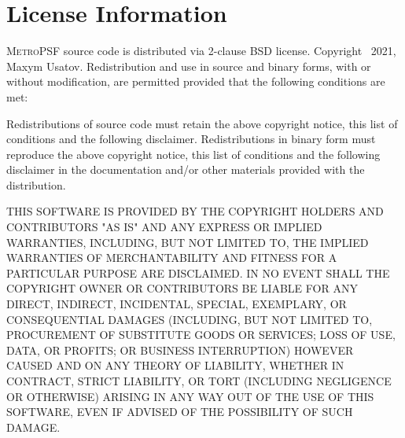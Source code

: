 \documentclass{article}
\begin{document}
\section{License Information}
\textsc{MetroPSF} source code is distributed via 2-clause BSD license. Copyright \textcopyright \ 2021, Maxym Usatov. Redistribution and use in source and binary forms, with or without modification, are permitted provided that the following conditions are met:

    Redistributions of source code must retain the above copyright notice, this list of conditions and the following disclaimer.
    Redistributions in binary form must reproduce the above copyright notice, this list of conditions and the following disclaimer in the documentation and/or other materials provided with the distribution.

THIS SOFTWARE IS PROVIDED BY THE COPYRIGHT HOLDERS AND CONTRIBUTORS "AS IS" AND ANY EXPRESS OR IMPLIED WARRANTIES, INCLUDING, BUT NOT LIMITED TO, THE IMPLIED WARRANTIES OF MERCHANTABILITY AND FITNESS FOR A PARTICULAR PURPOSE ARE DISCLAIMED. IN NO EVENT SHALL THE COPYRIGHT OWNER OR CONTRIBUTORS BE LIABLE FOR ANY DIRECT, INDIRECT, INCIDENTAL, SPECIAL, EXEMPLARY, OR CONSEQUENTIAL DAMAGES (INCLUDING, BUT NOT LIMITED TO, PROCUREMENT OF SUBSTITUTE GOODS OR SERVICES; LOSS OF USE, DATA, OR PROFITS; OR BUSINESS INTERRUPTION) HOWEVER CAUSED AND ON ANY THEORY OF LIABILITY, WHETHER IN CONTRACT, STRICT LIABILITY, OR TORT (INCLUDING NEGLIGENCE OR OTHERWISE) ARISING IN ANY WAY OUT OF THE USE OF THIS SOFTWARE, EVEN IF ADVISED OF THE POSSIBILITY OF SUCH DAMAGE.


 
\end{document}
